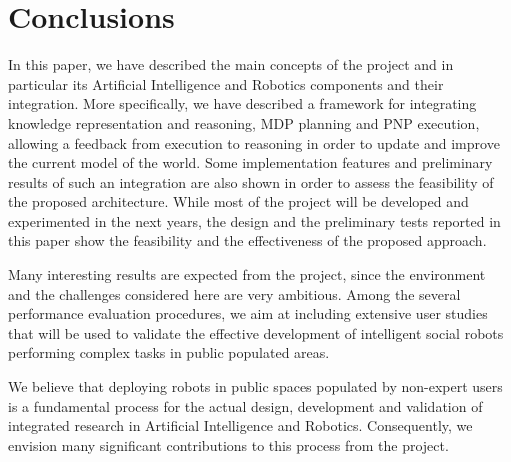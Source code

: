 \section{Conclusions}
\label{sec:conclu}

In this paper, we have described the main concepts of the \coaches project and in particular its Artificial Intelligence and Robotics components and their integration. 
More specifically, we have described a framework for integrating knowledge representation and reasoning, MDP planning and PNP execution, allowing a feedback from execution to reasoning in order to update and improve the current model of the world. 
Some implementation features and preliminary results of such an integration are also shown in order to assess the feasibility of the proposed architecture.
While most of the project will be developed and experimented in the next years, the design and the preliminary tests reported in this paper show the feasibility and the effectiveness of the proposed approach.

Many interesting results are expected from the \coaches project, since the environment and the challenges considered here are very ambitious. 
Among the several performance evaluation procedures, we aim at including extensive user studies that will be used to validate the effective development of intelligent social robots performing complex tasks in public populated areas. 

We believe that deploying robots in public spaces populated by non-expert users is a fundamental process for the actual design, development and validation of integrated research in Artificial Intelligence and Robotics. Consequently, we envision many significant contributions to this process from the \coaches project.






